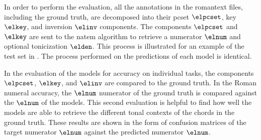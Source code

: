 
In order to perform the evaluation, all the annotations in
the \gls{romantext} files, including the ground truth, are
decomposed into their \gls{pcset} $\elpcset$, key $\elkey$,
and inversion $\elinv$ components. The components $\elpcset$
and $\elkey$ are sent to the \gls{natem} algorithm to
retrieve a numerator $\elnum$ and optional tonicization
$\elden$. This process is illustrated for an example of the
test set in . The process
performed on the predictions of each model is identical.


In the evaluation of the models for accuracy on individual
tasks, the components $\elpcset$, $\elkey$, and $\elinv$ are
compared to the ground truth. In the Roman numeral accuracy,
the $\elnum$ numerator of the ground truth is compared
against the $\elnum$ of the models. This second evaluation
is helpful to find how well the models are able to retrieve
the different tonal contexts of the chords in the ground
truth. These results are shown in the form of confusion
matrices of the target numerator $\elnum$ against the
predicted numerator $\elnum$.


